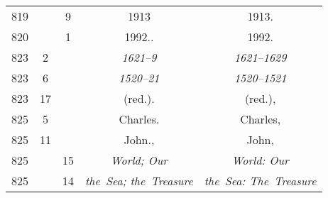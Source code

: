 \documentclass[a4paper,11pt]{article}
\numberwithin{equation}{section}
\begin{document}
\begin{center}
\begin{tabular}{|c|c|c|c|c|}
    819 & & \hphantom{0}9 & 1913 & 1913. \\
    820 & & \hphantom{0}1 & 1992.. & 1992. \\
    823 & \hphantom{0}2 & & \textit{1621--9} & \textit{1621--1629} \\
    823 & \hphantom{0}6 & & \textit{1520--21} & \textit{1520--1521} \\
    823 & 17 & & (red.). & (red.), \\
    825 & \hphantom{0}5 & & Charles. & Charles, \\
    825 & 11 & & John., & John, \\
    825 & & 15 & \textit{World; Our} & \textit{World: Our} \\
    825 & & 14 & \textit{the~Sea; the~Treasure}
    & \textit{the~Sea: The~Treasure} \\
    \hline
  \end{tabular}





  \newpage


\end{center}
\end{document}
